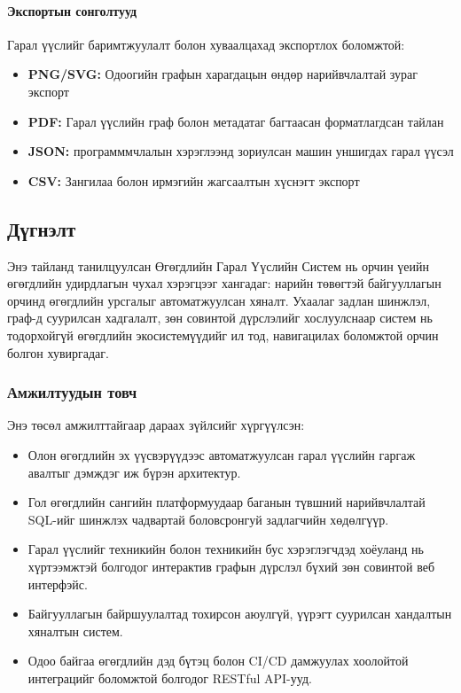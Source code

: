 \paragraph{Экспортын сонголтууд}
Гарал үүслийг баримтжуулалт болон хуваалцахад экспортлох боломжтой:
\begin{itemize}
    \item \textbf{PNG/SVG:} Одоогийн графын харагдацын өндөр нарийвчлалтай зураг экспорт
    \item \textbf{PDF:} Гарал үүслийн граф болон метадатаг багтаасан форматлагдсан тайлан
    \item \textbf{JSON:} программмчлалын хэрэглээнд зориулсан машин уншигдах гарал үүсэл
    \item \textbf{CSV:} Зангилаа болон ирмэгийн жагсаалтын хүснэгт экспорт
\end{itemize}

\subsection{Дүгнэлт}
\label{subsec:dl_conclusion}

Энэ тайланд танилцуулсан Өгөгдлийн Гарал Үүслийн Систем нь орчин үеийн өгөгдлийн удирдлагын чухал хэрэгцээг хангадаг: нарийн төвөгтэй байгууллагын орчинд өгөгдлийн урсгалыг автоматжуулсан хяналт. Ухаалаг задлан шинжлэл, граф-д суурилсан хадгалалт, зөн совинтой дүрслэлийг хослуулснаар систем нь тодорхойгүй өгөгдлийн экосистемүүдийг ил тод, навигацилах боломжтой орчин болгон хувиргадаг.

\subsubsection{Амжилтуудын товч}

Энэ төсөл амжилттайгаар дараах зүйлсийг хүргүүлсэн:

\begin{itemize}
    \item Олон өгөгдлийн эх үүсвэрүүдээс автоматжуулсан гарал үүслийн гаргаж авалтыг дэмждэг иж бүрэн архитектур.
    
    \item Гол өгөгдлийн сангийн платформуудаар баганын түвшний нарийвчлалтай SQL-ийг шинжлэх чадвартай боловсронгуй задлагчийн хөдөлгүүр.
    
    \item Гарал үүслийг техникийн болон техникийн бус хэрэглэгчдэд хоёуланд нь хүртээмжтэй болгодог интерактив графын дүрслэл бүхий зөн совинтой веб интерфэйс.
    
    \item Байгууллагын байршуулалтад тохирсон аюулгүй, үүрэгт суурилсан хандалтын хяналтын систем.
    
    \item Одоо байгаа өгөгдлийн дэд бүтэц болон CI/CD дамжуулах хоолойтой интеграцийг боломжтой болгодог RESTful API-ууд.
\end{itemize}

